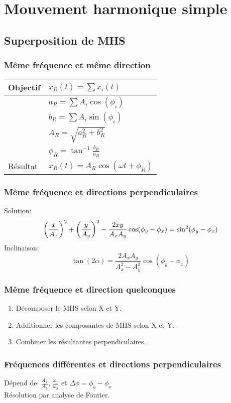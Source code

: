 \section{Mouvement harmonique simple}
\begin{center}
    
\end{center}

\subsection{Superposition de MHS}
\subsubsection{Même fréquence et même direction}
\centering
\begin{tabular}{l|l}
    Objectif &  \(x_R(t)=\sum x_i(t)\)\\\hline
     & \(a_R=\sum A_i\cos(\phi_i)\)\\
     & \(b_R=\sum A_i\sin(\phi_i)\)\\
     & \(A_R=\sqrt{a_R^2+b_R^2}\)\\
     & \(\phi_R=\tan^{-1}\frac{b_R}{a_R}\)\\[8pt]\hline
    Résultat & \(x_R(t)=A_R\cos(\omega t + \phi_R)\) 
\end{tabular}

\raggedright
\subsubsection{Même fréquence et directions perpendiculaires}
Solution:
\begin{equation*}
    \qty(\frac{x}{A_x})^2+\qty(\frac{y}{A_y})^2-\frac{2xy}{A_x A_y}\cos(\phi_y-\phi_x)=\sin^2(\phi_y-\phi_x)
\end{equation*}
Inclinaison:
\begin{equation*}
    \tan(2\alpha)=\frac{2A_x A_y}{A_x^2-A_y^2}\cos(\phi_y-\phi_x)
\end{equation*}

\subsubsection{Même fréquence et direction quelconques}
\begin{center}
    
\end{center}
\begin{enumerate}[nosep]
    \item Décomposer le MHS selon X et Y.
    \item Additionner les composantes de MHS selon X et Y.
    \item Combiner les résultantes perpendiculaires.
\end{enumerate}

\subsubsection{Fréquences différentes et directions perpendiculaires}
Dépend de: \( \frac{A_x}{A_y}\), \(\frac{\omega_x}{\omega_y}\) et \(\Delta\phi=\phi_y-\phi_x\)\\
Résolution par analyse de Fourier.